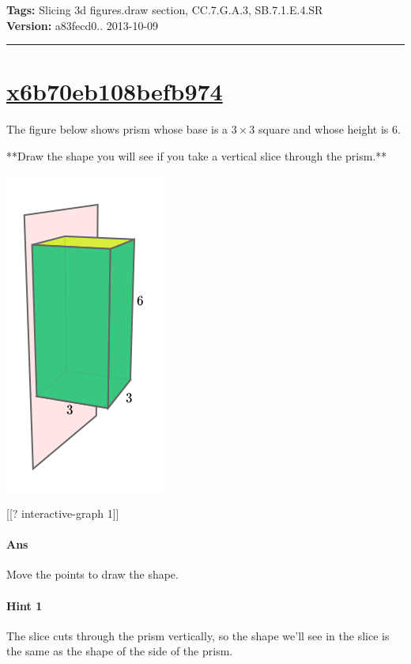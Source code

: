 \documentclass[twocolumn,10pt]{article}
\def\shrinkfactor{0.4}
\begin{document}
\medskip
\noindent
\textbf{Tags:} {\footnotesize Slicing 3d figures.draw section, CC.7.G.A.3, SB.7.1.E.4.SR}\\
\textbf{Version:} a83fecd0.. 2013-10-09
\smallskip\hrule





\section{\href{https://www.khanacademy.org/devadmin/content/items/x6b70eb108befb974}{x6b70eb108befb974}}

\noindent
The figure below shows prism whose base is a $3\times 3$ square and whose height is $6$.   

**Draw the shape you will see if you take a vertical slice through the prism.**


\includegraphics[scale=\shrinkfactor]{figures/94bf14f4775048a20e633abd42558d8e108ecfab.png}

[[? interactive-graph 1]] 

\paragraph{Ans} Move the points to draw the shape. 

\paragraph{Hint 1}The slice cuts through the prism vertically, so the shape we'll see in the slice is the same as the shape of the side of the prism.
\end{document}
